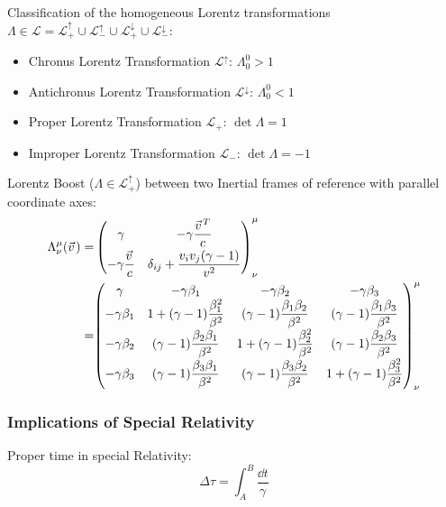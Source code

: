 			\noindent
			Classification of the homogeneous Lorentz transformations $\Lambda \in \mathcal{L} = \mathcal{L}^\uparrow_+ \cup \mathcal{L}^\uparrow_- \cup \mathcal{L}^\downarrow_+ \cup \mathcal{L}^\downarrow_-$:
			\begin{itemize}
				\item Chronus Lorentz Transformation $\mathcal{L}^\uparrow$: $\Lambda^0_0 > 1$
				\item Antichronus Lorentz Transformation $\mathcal{L}^\downarrow$: $\Lambda^0_0 < 1$
				\item Proper Lorentz Transformation $\mathcal{L}_+$: $\det\Lambda = 1$
				\item Improper Lorentz Transformation $\mathcal{L}_-$: $\det\Lambda = -1$
			\end{itemize}

			\noindent
			Lorentz Boost ($\Lambda\in\mathcal{L}^\uparrow_+$) between two Inertial frames of reference with parallel coordinate axes:
			\begin{equation}
				\begin{aligned}
					\Lambda^{\mu}_{\nu}(\vec{v})
					=& \left( \begin{matrix}
						\gamma                    & -\gamma\dfrac{\vec{v}^T}{c}                \\[6pt]
						-\gamma\dfrac{\vec{v}}{c} & \delta_{ij}+\dfrac{v_i v_j(\gamma-1)}{v^2}
					\end{matrix} \right)^{\mu}_{\nu} \\
					=&
					\mqty(
					\gamma & -\gamma \beta_1 & -\gamma \beta_2 & -\gamma \beta_3 \\
					-\gamma \beta_1 & 1+(\gamma -1){\dfrac {\beta_1^{2}}{\beta^{2}}} & (\gamma -1){\dfrac {\beta_1 \beta_2}{\beta^{2}}}&(\gamma -1){\dfrac {\beta_1\beta_3}{\beta^{2}}} \\
					-\gamma \beta_2 & (\gamma -1){\dfrac {\beta_2\beta_1}{\beta^{2}}} & 1+(\gamma -1){\dfrac {\beta_2^{2}}{\beta^{2}}}&(\gamma -1){\dfrac {\beta_2 \beta_3}{\beta^{2}}} \\
					-\gamma \beta_3 &(\gamma -1){\dfrac {\beta_3\beta_1}{\beta^{2}}}&(\gamma -1){\dfrac {\beta_3\beta_2}{\beta^{2}}}&1+(\gamma -1){\dfrac {\beta_3^{2}}{\beta^{2}}}
					)^{\mu}_{\nu}
				\end{aligned}
			\end{equation}

		\subsubsection{Implications of Special Relativity}
			\noindent
			Proper time in special Relativity:
			\begin{equation}
				\Delta\tau = \int_A^B \frac{\dd t}{\gamma}
			\end{equation}

